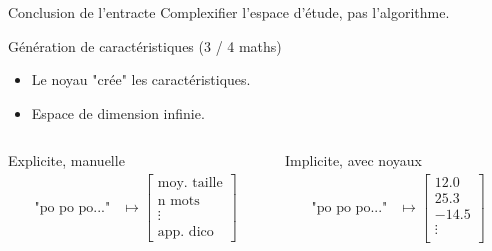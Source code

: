 \documentclass{beamer}
\begin{document}
\begin{frame}{Conclusion de l'entracte}
Complexifier l'espace d'étude, pas l'algorithme.
\end{frame}

\begin{frame}{Génération de caractéristiques (3 / 4 maths)}
\begin{itemize}
	\item Le noyau "crée" les caractéristiques.
	\item Espace de dimension infinie.
\end{itemize}
	\begin{columns}
		\begin{column}{0.45\textwidth}
			\begin{block}{Explicite, manuelle}
				\begin{align*}
				\text{"po po po..."} & \mapsto \begin{bmatrix}
				\text{moy. taille} \\
				\text{n mots} \\
				\vdots \\
				\text{app. dico}
				\end{bmatrix}
				\end{align*}
			\end{block}
		\end{column}
		\begin{column}{0.45\textwidth}
			\begin{block}{Implicite, avec noyaux}
				\begin{align*}
				\text{"po po po..."} & \mapsto \begin{bmatrix}
				12.0 \\
				25.3 \\
				-14.5 \\
				\vdots \\
				\end{bmatrix}
				\end{align*}
			\end{block}
		\end{column}
	\end{columns}
\end{frame}
\end{document}

